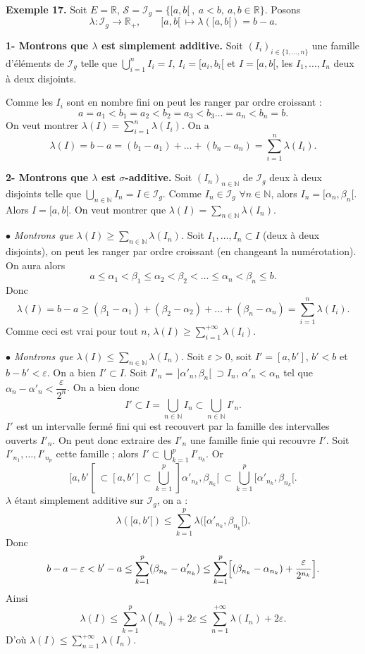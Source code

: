 \documentclass[11pt,a4paper]{article}
\newcommand{\R}{\mathbb{R}}
\newcommand{\N}{\mathbb{N}}
\newcommand{\Ss}{\mathscr{S}}
\newcommand{\Ii}{\mathscr{I}}
\begin{document}
\textbf{\color{bleu}Exemple 17.} Soit $E=\R$, $\Ss=\Ii_g=\bigl\{[a,b[\ ,\ a<b,\ a,b\in\R\bigr\}$. Posons
\[
  \lambda:\Ii_g\longrightarrow\R_+,\qquad [a,b[\ \longmapsto\lambda([a,b[)=b-a .
\]

\textbf{1- Montrons que $\lambda$ est simplement additive.}
Soit $(I_i)_{i\in\{1,\dots,n\}}$ une famille d'éléments de $\Ii_g$ telle que $\bigcup_{i=1}^{n}I_i=I$, $I_i=[a_i,b_i[$ et $I=[a,b[$, les $I_1,\dots,I_n$ deux à deux disjoints.

Comme les $I_i$ sont en nombre fini on peut les ranger par ordre croissant :
\[
  a=a_1<b_1=a_2<b_2=a_3<b_3\dots=a_n<b_n=b .
\]
On veut montrer $\lambda(I)=\sum_{i=1}^{n}\lambda(I_i)$. On a
\[
  \lambda(I)=b-a=(b_1-a_1)+\dots+(b_n-a_n)=\sum_{i=1}^{n}\lambda(I_i).
\]

\textbf{2- Montrons que $\lambda$ est $\sigma$-additive.}
Soit $(I_n)_{n\in\N}$ de $\Ii_g$ deux à deux disjoints telle que $\bigcup_{n\in\N}I_n=I\in\Ii_g$.
Comme $I_n\in\Ii_g$ $\forall n\in\N$, alors $I_n=[\alpha_n,\beta_n[$. Alors $I=[a,b[$.
On veut montrer que $\lambda(I)=\sum_{n\in\N}\lambda(I_n)$.

\emph{$\bullet$ Montrons que $\lambda(I)\ge\sum_{n\in\N}\lambda(I_n)$.}
Soit $I_1,\dots,I_n\subset I$ (deux à deux disjoints), on peut les ranger par ordre croissant (en changeant la numérotation). On aura alors
\[
  a\le\alpha_1<\beta_1\le\alpha_2<\beta_2<\dots\le\alpha_n<\beta_n\le b .
\]
Donc
\[
  \lambda(I)=b-a\ge(\beta_1-\alpha_1)+(\beta_2-\alpha_2)+\dots+(\beta_n-\alpha_n)=\sum_{i=1}^{n}\lambda(I_i).
\]
Comme ceci est vrai pour tout $n$, $\displaystyle\lambda(I)\ge\sum_{i=1}^{+\infty}\lambda(I_i)$.

\emph{$\bullet$ Montrons que $\lambda(I)\le\sum_{n\in\N}\lambda(I_n)$.}
Soit $\varepsilon>0$, soit $I'=[a,b']$, $b'<b$ et $b-b'<\varepsilon$. On a bien $I'\subset I$.
Soit $I'_n=\,]\alpha'_n,\beta_n[\ \supset I_n$, $\alpha'_n<\alpha_n$ tel que $\alpha_n-\alpha'_n<\dfrac{\varepsilon}{2^n}$.
On a bien donc
\[
  I'\subset I=\bigcup_{n\in\N}I_n\subset\bigcup_{n\in\N}I'_n .
\]
$I'$ est un intervalle fermé fini qui est recouvert par la famille des intervalles ouverts $I'_n$. On peut donc extraire des $I'_n$ une famille finie qui recouvre $I'$.
Soit $I'_{n_1},\dots,I'_{n_p}$ cette famille ; alors $I'\subset\bigcup_{k=1}^{p}I'_{n_k}$. Or
\[
  [a,b'[\ \subset[a,b']\subset\bigcup_{k=1}^{p}\,]\alpha'_{n_k},\beta_{n_k}[\ \subset\bigcup_{k=1}^{p}[\alpha'_{n_k},\beta_{n_k}[ .
\]
$\lambda$ étant simplement additive sur $\Ii_g$, on a :
\[
  \lambda([a,b'[)\le\sum_{k=1}^{p}\lambda\bigl([\alpha'_{n_k},\beta_{n_k}[\bigr).
\]
Donc
\[
  b-a-\varepsilon<b'-a\le\sum_{k=1}^{p}(\beta_{n_k}-\alpha'_{n_k})\le\sum_{k=1}^{p}\Bigl[(\beta_{n_k}-\alpha_{n_k})+\frac{\varepsilon}{2^{n_k}}\Bigr].
\]
Ainsi
\[
  \lambda(I)\le\sum_{k=1}^{p}\lambda(I_{n_k})+2\varepsilon\le\sum_{n=1}^{+\infty}\lambda(I_n)+2\varepsilon .
\]
D'où $\displaystyle\lambda(I)\le\sum_{n=1}^{+\infty}\lambda(I_n)$.
\end{document}
